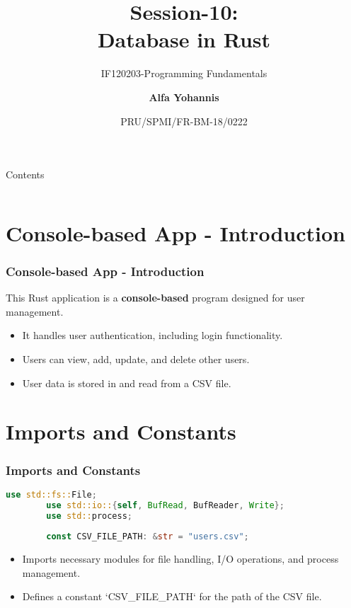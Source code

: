 \documentclass[aspectratio=169, table]{beamer}
\subtitle{IF120203-Programming Fundamentals}
\title{Session-10:\\\LARGE{Database in Rust}\\ \vspace{10pt}}
\date[Serial]{\scriptsize {PRU/SPMI/FR-BM-18/0222}}
\author[Pradita]{\small{\textbf{Alfa Yohannis}}}
\begin{document}
\frame{\titlepage}

\begin{frame}{Contents}
	\vspace{15pt}
	\begin{columns}[t]
		\begin{column}{.5\textwidth}
			\tableofcontents[sections={1-12}]
		\end{column}
		\begin{column}{.5\textwidth}
			\tableofcontents[sections={13-24}]
		\end{column}
	\end{columns}
\end{frame}

\section{Console-based App - Introduction}
\begin{frame}
	\frametitle{Console-based App - Introduction}
	\vspace{15pt}
	This Rust application is a \textbf{console-based} program designed for user management.
	\begin{itemize}
		\item It handles user authentication, including login functionality.
		\item Users can view, add, update, and delete other users.
		\item User data is stored in and read from a CSV file.
	\end{itemize}
\end{frame}

\section{Imports and Constants}
\begin{frame}[fragile]
	\frametitle{Imports and Constants}
	\begin{lstlisting}[language=Rust]
		use std::fs::File;
		use std::io::{self, BufRead, BufReader, Write};
		use std::process;
		
		const CSV_FILE_PATH: &str = "users.csv";
	\end{lstlisting}
	\begin{itemize}
		\item Imports necessary modules for file handling, I/O operations, and process management.
		\item Defines a constant `CSV\_FILE\_PATH` for the path of the CSV file.
	\end{itemize}
\end{frame}
\end{document}
